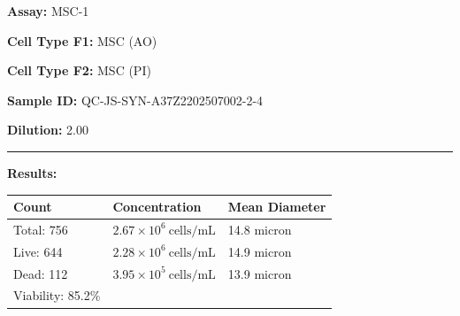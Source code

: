 \documentclass[UTF8,10pt,a4paper,fontset=fandol]{ctexart}
\renewcommand{\arraystretch}{1.15}
\newcommand{\fieldvalue}[1]{#1}
\begin{document}
\begin{center}
\begin{center}
\newpage

\noindent\textbf{Assay:} 
\fieldvalue{MSC-1}

\medskip
\noindent\textbf{Cell Type F1:} 
\fieldvalue{MSC (AO)}

\noindent\textbf{Cell Type F2:} 
\fieldvalue{MSC (PI)}

\medskip
\noindent\textbf{Sample ID:} 
\fieldvalue{QC-JS-SYN-A37Z2202507002-2-4}

\noindent\textbf{Dilution:} 
\fieldvalue{2.00}

\medskip
\noindent\rule{\textwidth}{0.4pt}

\noindent\textbf{Results:}

\medskip
\renewcommand{\arraystretch}{1.15}
\begin{tabularx}{\textwidth}{@{}X X X@{}}
\textbf{Count} & \textbf{Concentration} & \textbf{Mean Diameter} \\
\hline
Total:
\fieldvalue{756}
&
\fieldvalue{$2.67\times10^{6}\ \mathrm{cells/mL}$}
&
\fieldvalue{14.8 micron}
\\
Live:
\fieldvalue{644}
&
\fieldvalue{$2.28\times10^{6}\ \mathrm{cells/mL}$}
&
\fieldvalue{14.9 micron}
\\
Dead:
\fieldvalue{112}
&
\fieldvalue{$3.95\times10^{5}\ \mathrm{cells/mL}$}
&
\fieldvalue{13.9 micron}
\\
Viability:
\fieldvalue{85.2\%}
&
&
\end{tabularx}

\medskip

\noindent
\begin{minipage}[t]{0.48\textwidth}
\centering
\fbox{\rule{0pt}{0.25\textheight}\rule{0.95\linewidth}{0pt}}
\end{minipage}
\hfill
\begin{minipage}[t]{0.48\textwidth}
\centering
\fbox{\rule{0pt}{0.25\textheight}\rule{0.95\linewidth}{0pt}}
\end{minipage}


\end{center}
\end{center}
\end{document}
